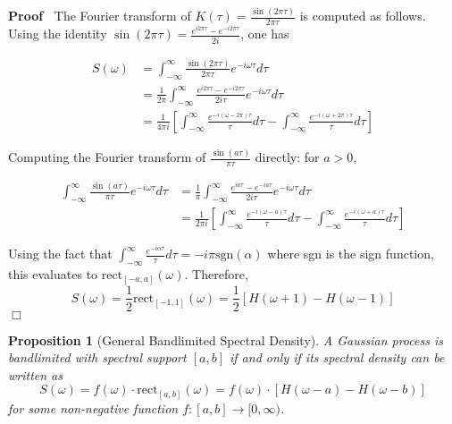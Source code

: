 \documentclass{article}
\newenvironment{proof}{\noindent\textbf{Proof\ }}{\hspace*{\fill}$\Box$\medskip}
\newtheorem{proposition}{Proposition}
\begin{document}
\begin{proof}
  The Fourier transform of $K (\tau) = \frac{\sin (2 \pi \tau)}{2 \pi \tau}$
  is computed as follows. Using the identity $\sin (2 \pi \tau) = \frac{e^{i 2
  \pi \tau} - e^{- i 2 \pi \tau}}{2 i}$, one has
  
  \begin{align}
    S (\omega) & = \int_{- \infty}^{\infty} \frac{\sin (2 \pi \tau)}{2 \pi
    \tau} e^{- i \omega \tau} d \tau \\
    & = \frac{1}{2 \pi}  \int_{- \infty}^{\infty} \frac{e^{i 2 \pi \tau} -
    e^{- i 2 \pi \tau}}{2 i \tau} e^{- i \omega \tau} d \tau \\
    & = \frac{1}{4 \pi i}  \left[ \int_{- \infty}^{\infty} \frac{e^{- i
    (\omega - 2 \pi) \tau}}{\tau} d \tau - \int_{- \infty}^{\infty} \frac{e^{-
    i (\omega + 2 \pi) \tau}}{\tau} d \tau \right] 
  \end{align}
  
  Computing the Fourier transform of $\frac{\sin (a \tau)}{\pi \tau}$
  directly: for $a > 0$,
  
  \begin{align}
    \int_{- \infty}^{\infty} \frac{\sin (a \tau)}{\pi \tau} e^{- i \omega
    \tau} d \tau & = \frac{1}{\pi}  \int_{- \infty}^{\infty} \frac{e^{ia \tau}
    - e^{- ia \tau}}{2 i \tau} e^{- i \omega \tau} d \tau \\
    & = \frac{1}{2 \pi i}  \left[ \int_{- \infty}^{\infty} \frac{e^{- i
    (\omega - a) \tau}}{\tau} d \tau - \int_{- \infty}^{\infty} \frac{e^{- i
    (\omega + a) \tau}}{\tau} d \tau \right] 
  \end{align}
  
  Using the fact that $\int_{- \infty}^{\infty} \frac{e^{- i \alpha
  \tau}}{\tau} d \tau = - i \pi \text{sgn} (\alpha)$ where sgn is the sign
  function, this evaluates to $\mathrm{rect}_{[- a, a]} (\omega)$. Therefore,
  \begin{equation}
    S (\omega) = \frac{1}{2} \mathrm{rect}_{[- 1, 1]} (\omega) = \frac{1}{2} 
    [H (\omega + 1) - H (\omega - 1)]
  \end{equation}
\end{proof}

\begin{proposition}
  [General Bandlimited Spectral Density] A Gaussian process is bandlimited
  with spectral support $[a, b]$ if and only if its spectral density can be
  written as
  \begin{equation}
    S (\omega) = f (\omega) \cdot \mathrm{rect}_{[a, b]} (\omega) = f (\omega)
    \cdot [H (\omega - a) - H (\omega - b)]
  \end{equation}
  for some non-negative function $f : [a, b] \to [0, \infty)$.
\end{proposition}
\end{document}
